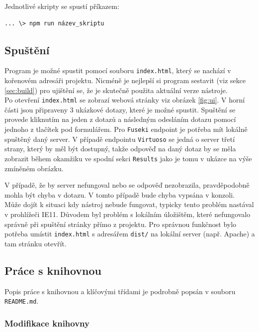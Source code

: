 \documentclass[
12pt,
a4paper,
pdftex,
czech,
titlepage
]{article}
\begin{document}
\noindent Jednotlivé skripty se spustí příkazem:

\begin{verbatim}
... \> npm run název_skriptu
\end{verbatim}

\subsection{Spuštění}

Program je možné spustit pomocí souboru \texttt{index.html}, který se nachází v kořenovém adresáři projektu. Nicméně je nejlepší si program sestavit (viz sekce \ref{sec:build}) pro ujištění se, že je skutečně použita aktuální verze nástroje. \\

Po otevření \texttt{index.html} se zobrazí webová stránky viz obrázek \ref{fig:ui}. V horní části jsou připraveny 3 ukázkové dotazy, které je možné spustit. Spuštění se provede kliknutím na jeden z dotazů a následným odesláním dotazu pomocí jednoho z tlačítek pod formulářem. Pro \texttt{Fuseki} endpoint je potřeba mít lokálně spuštěný daný server. V případě endpointu \texttt{Virtuoso} se jedná o server třetí strany, který by měl být dostupný, takže odpověď na daný dotaz by se měla zobrazit během okamžiku ve spodní sekci \texttt{Results} jako je tomu v ukázce na výše zmíněném obrázku.

V případě, že by server nefungoval nebo se odpověď nezobrazila, pravděpodobně mohla být chyba v dotazu. V tomto případě bude chyba vypsána v konzoli.\\

Může dojít k situaci kdy nástroj nebude fungovat, typicky tento problém nastával v prohlížeči IE11. Důvodem byl problém s lokálním úložištěm, které nefungovalo správně při spuštění stránky přímo z projektu. Pro správnou funkčnost bylo potřeba umístit \texttt{index.html} s adresářem \texttt{dist/} na lokální server (např. Apache) a tam stránku otevřít.

\subsection{Práce s knihovnou}

Popis práce s knihovnou a klíčovými třídami je podrobně popsán v souboru \texttt{README.md}.

\subsubsection{Modifikace knihovny}
\end{document}
